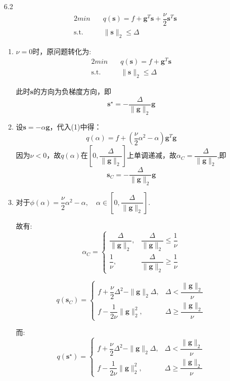 \documentclass[UTF8]{ctexart}
\begin{document}
\begin{enumerate}
\item[6.2]
\begin{alignat}{2}
min \quad & q(\bm{s})=f+\bm{g}^{T}\bm{s}+\dfrac{\nu}{2}\bm{s}^T\bm{s} \\
\mbox{s.t.}\quad
&\|\bm{s}\|_2\leq\Delta \nonumber
\end{alignat}
\begin{enumerate}
\item 
$\nu=0$时，原问题转化为:
\begin{alignat}{2}
min \quad & q(\bm{s})=f+\bm{g}^{T}\bm{s} \nonumber\\
\mbox{s.t.}\quad
&\|\bm{s}\|_2\leq\Delta \nonumber
\end{alignat}

此时$\bm{s}$的方向为负梯度方向，即
\[\bm{s}^{\star}=-\dfrac{\Delta}{\|\bm{g}\|_2}\bm{g}\]

\item
设$\bm{s}=-\alpha\bm{g}$，代入(1)中得：
\begin{equation}
q(\alpha)=f+(\dfrac{\nu}{2}\alpha^2-\alpha)\bm{g}^T\bm{g}
\end{equation}	
因为$\nu<0$，故$q(\alpha)$在$[0,\dfrac{\Delta}{\|\bm{g}\|_2}]$上单调递减，故$\alpha_{C}=\dfrac{\Delta}{\|\bm{g}\|_2}$,即
\[\bm{s}_{C}=-\dfrac{\Delta}{\|\bm{g}\|_2}\bm{g}\]

\item
对于$\phi(\alpha)=\dfrac{\nu}{2}\alpha^2-\alpha,\quad \alpha\in [0,\dfrac{\Delta}{\|\bm{g}\|_2}]$.

故有:
\[\alpha_{C} = \begin{cases}
\dfrac{\Delta}{\|\bm{g}\|_2},& \dfrac{\Delta}{\|\bm{g}\|_2}\leq \dfrac{1}{\nu}\\
\dfrac{1}{\nu},& \dfrac{\Delta}{\|\bm{g}\|_2}\geq \dfrac{1}{\nu}
\end{cases}\]

\[q(\bm{s}_C)=\begin{cases}
f+\dfrac{\nu}{2}\Delta^2-\|\bm{g}\|_2\Delta,
& \Delta < \dfrac{\|\bm{g}\|_2}{\nu}\\
f-\dfrac{1}{2\nu}\|\bm{g}\|_2^2,& \Delta\geq\dfrac{\|\bm{g}\|_2}{\nu}
\end{cases}\]

而:
\[q(\bm{s}^{\star})=\begin{cases}
f+\dfrac{\nu}{2}\Delta^2-\|\bm{g}\|_2\Delta,
& \Delta < \dfrac{\|\bm{g}\|_2}{\nu}\\
f-\dfrac{1}{2\nu}\|\bm{g}\|_2^2,& \Delta\geq\dfrac{\|\bm{g}\|_2}{\nu}
\end{cases}\]


\end{enumerate}
\end{enumerate}
\end{document}
